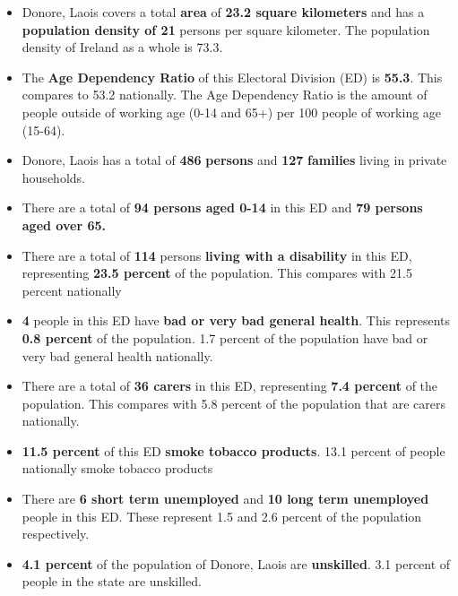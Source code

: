 \documentclass{article}
\begin{document}
\begin{itemize}

\item Donore, Laois covers a total \textbf{area} of  \textbf{23.2 square kilometers} and has a \textbf{population density of 21} persons per square kilometer. The population density of Ireland as a whole is  73.3. 

\item The \textbf{Age Dependency Ratio} of this Electoral Division (ED) is  \textbf{55.3}. This compares to 53.2 nationally. The Age Dependency Ratio is the amount of people outside of working age (0-14 and 65+) per 100 people of working age (15-64). 

\item Donore, Laois has a total of \textbf{486} \textbf{persons} and  \textbf{127} \textbf{families} living in private households.

\item There are a total of \textbf{94 persons aged 0-14} in this ED and \textbf{79 persons aged over 65.} 

\item There are a total of \textbf{114} persons \textbf{living with a disability} in this ED, representing \textbf{23.5 percent} of the population. This compares with  21.5 percent nationally

\item \textbf{4} people in this ED have \textbf{bad or very bad general health}. This represents \textbf{0.8 percent} of the population. 1.7 percent of the population have bad or very bad general health nationally. 

\item There are a total of \textbf{36 carers} in this ED, representing \textbf{7.4 percent} of the population. This compares with 5.8 percent of the population that are carers nationally. 

\item \textbf{11.5 percent} of this ED \textbf{smoke tobacco products}. 13.1 percent of people nationally smoke tobacco products

\item There are \textbf{6 short term unemployed} and \textbf{10 long term unemployed} people in this ED. These represent 1.5 and 2.6 percent of the population respectively.

\item  \textbf{4.1 percent} of the population of Donore, Laois are \textbf{unskilled}. 3.1 percent of people in the state are unskilled.


\end{itemize}
\end{document}

